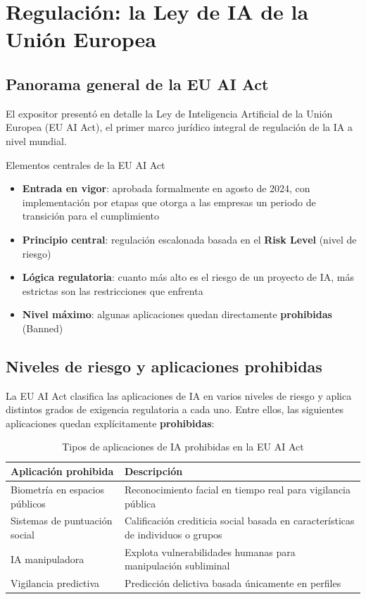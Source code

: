 \section{Regulación: la Ley de IA de la Unión Europea}

\subsection{Panorama general de la EU AI Act}

El expositor presentó en detalle la Ley de Inteligencia Artificial de la Unión Europea (EU AI Act), el primer marco jurídico integral de regulación de la IA a nivel mundial.

\begin{importantbox}{Elementos centrales de la EU AI Act}
\begin{itemize}
    \item \textbf{Entrada en vigor}: aprobada formalmente en agosto de 2024, con implementación por etapas que otorga a las empresas un periodo de transición para el cumplimiento
    \item \textbf{Principio central}: regulación escalonada basada en el \textbf{Risk Level} (nivel de riesgo)
    \item \textbf{Lógica regulatoria}: cuanto más alto es el riesgo de un proyecto de IA, más estrictas son las restricciones que enfrenta
    \item \textbf{Nivel máximo}: algunas aplicaciones quedan directamente \textbf{prohibidas} (Banned)
\end{itemize}
\end{importantbox}

\subsection{Niveles de riesgo y aplicaciones prohibidas}

La EU AI Act clasifica las aplicaciones de IA en varios niveles de riesgo y aplica distintos grados de exigencia regulatoria a cada uno. Entre ellos, las siguientes aplicaciones quedan explícitamente \textbf{prohibidas}:

\begin{table}[H]
\centering
\caption{Tipos de aplicaciones de IA prohibidas en la EU AI Act}
\begin{tabular}{@{}ll@{}}
\toprule
\textbf{Aplicación prohibida} & \textbf{Descripción} \\
\midrule
Biometría en espacios públicos & Reconocimiento facial en tiempo real para vigilancia pública \\
Sistemas de puntuación social & Calificación crediticia social basada en características de individuos o grupos \\
IA manipuladora & Explota vulnerabilidades humanas para manipulación subliminal \\
Vigilancia predictiva & Predicción delictiva basada únicamente en perfiles \\
\bottomrule
\end{tabular}
\end{table}

